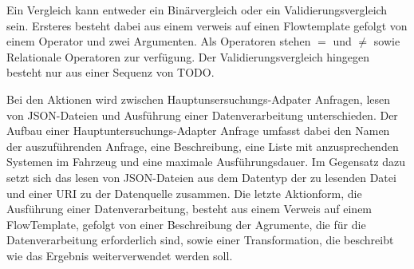 \documentclass{article}
\begin{document}
    Ein Vergleich kann entweder ein Binärvergleich oder ein Validierungsvergleich sein.
    Ersteres besteht dabei aus einem verweis auf einen Flowtemplate gefolgt von einem Operator und zwei Argumenten. Als Operatoren stehen $=$ und $\neq$ sowie Relationale Operatoren zur verfügung.
    Der Validierungsvergleich hingegen besteht nur aus einer Sequenz von TODO.

    Bei den Aktionen wird zwischen Hauptunsersuchungs-Adpater Anfragen, lesen von JSON-Dateien und Ausführung einer Datenverarbeitung unterschieden.
    Der Aufbau einer Hauptuntersuchungs-Adapter Anfrage umfasst dabei den Namen der auszuführenden Anfrage, eine Beschreibung, eine Liste mit anzusprechenden Systemen im Fahrzeug und eine maximale Ausführungsdauer.
    Im Gegensatz dazu setzt sich das lesen von JSON-Dateien aus dem Datentyp der zu lesenden Datei und einer URI zu der Datenquelle zusammen.
    Die letzte Aktionform, die Ausführung einer Datenverarbeitung, besteht aus einem Verweis auf einem FlowTemplate, gefolgt von einer Beschreibung der Agrumente, die für die Datenverarbeitung erforderlich sind, sowie einer Transformation, die beschreibt wie das Ergebnis weiterverwendet werden soll.    
    
\end{document}
